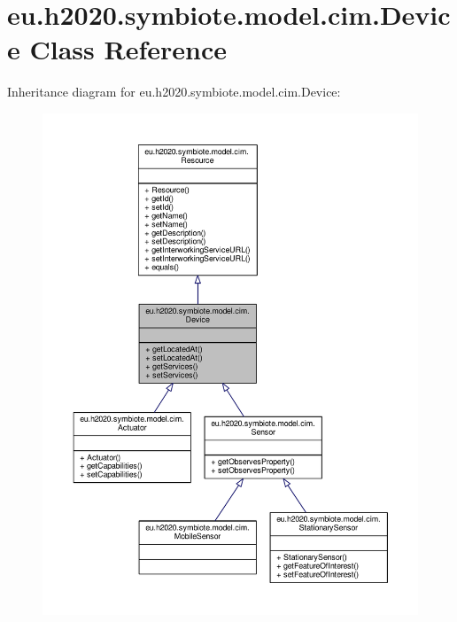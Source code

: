 \hypertarget{classeu_1_1h2020_1_1symbiote_1_1model_1_1cim_1_1Device}{}\section{eu.\+h2020.\+symbiote.\+model.\+cim.\+Device Class Reference}
\label{classeu_1_1h2020_1_1symbiote_1_1model_1_1cim_1_1Device}


Inheritance diagram for eu.\+h2020.\+symbiote.\+model.\+cim.\+Device\+:
\nopagebreak
\begin{figure}[H]
\begin{center}
\leavevmode
\includegraphics[width=350pt]{classeu_1_1h2020_1_1symbiote_1_1model_1_1cim_1_1Device__inherit__graph}
\end{center}
\end{figure}



